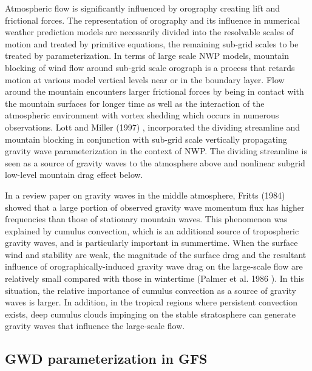 Atmospheric flow is significantly influenced by orography creating lift and frictional forces. The representation of orography and its influence in numerical weather prediction models are necessarily divided into the resolvable scales of motion and treated by primitive equations, the remaining sub-\/grid scales to be treated by parameterization. In terms of large scale N\+WP models, mountain blocking of wind flow around sub-\/grid scale orograph is a process that retards motion at various model vertical levels near or in the boundary layer. Flow around the mountain encounters larger frictional forces by being in contact with the mountain surfaces for longer time as well as the interaction of the atmospheric environment with vortex shedding which occurs in numerous observations. Lott and Miller (1997) \cite{lott_and_miller_1997}, incorporated the dividing streamline and mountain blocking in conjunction with sub-\/grid scale vertically propagating gravity wave parameterization in the context of N\+WP. The dividing streamline is seen as a source of gravity waves to the atmosphere above and nonlinear subgrid low-\/level mountain drag effect below.

In a review paper on gravity waves in the middle atmosphere, Fritts (1984) \cite{fritts_1984} showed that a large portion of observed gravity wave momentum flux has higher frequencies than those of stationary mountain waves. This phenomenon was explained by cumulus convection, which is an additional source of tropospheric gravity waves, and is particularly important in summertime. When the surface wind and stability are weak, the magnitude of the surface drag and the resultant influence of orographically-\/induced gravity wave drag on the large-\/scale flow are relatively small compared with those in wintertime (Palmer et al. 1986 \cite{palmer_et_al_1986}). In this situation, the relative importance of cumulus convection as a source of gravity waves is larger. In addition, in the tropical regions where persistent convection exists, deep cumulus clouds impinging on the stable stratosphere can generate gravity waves that influence the large-\/scale flow.\hypertarget{group___g_f_s__gwd_outlines}{}\subsection{G\+W\+D parameterization in G\+FS}\label{group___g_f_s__gwd_outlines}

